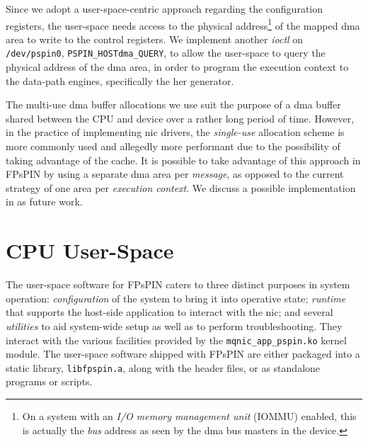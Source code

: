 Since we adopt a user-space-centric approach regarding the configuration registers, the user-space needs access to the physical address\footnote{On a system with an \emph{I/O memory management unit} (IOMMU) enabled, this is actually the \emph{bus} address as seen by the \ac{dma} bus masters in the device.} of the mapped \ac{dma} area to write to the control registers.  We implement another \emph{ioctl} on \texttt{/dev/pspin0}, \texttt{PSPIN\_\-HOST\ac{dma}\_\-QUERY}, to allow the user-space to query the physical address of the \ac{dma} area, in order to program the execution context to the data-path engines, specifically the \ac{her} generator.

The multi-use \ac{dma} buffer allocations we use suit the purpose of a \ac{dma} buffer shared between the CPU and device over a rather long period of time.  However, in the practice of implementing \ac{nic} drivers, the \emph{single-use} allocation scheme is more commonly used and allegedly more performant due to the possibility of taking advantage of the cache.  It is possible to take advantage of this approach in FPsPIN by using a separate \ac{dma} area per \emph{message}, as opposed to the current strategy of one area per \emph{execution context}.  We discuss a possible implementation in  as future work.

\section{CPU User-Space} \label{sec:sw-lib}

The user-space software for FPsPIN caters to three distinct purposes in system operation: \emph{configuration} of the system to bring it into operative state; \emph{runtime} that supports the host-side application to interact with the \ac{nic}; and several \emph{utilities} to aid system-wide setup as well as to perform troubleshooting.  They interact with the various facilities provided by the \texttt{mqnic\_\-app\_\-pspin.ko} kernel module.  The user-space software shipped with FPsPIN are either packaged into a static library, \texttt{libfpspin.a}, along with the header files, or as standalone programs or scripts.

